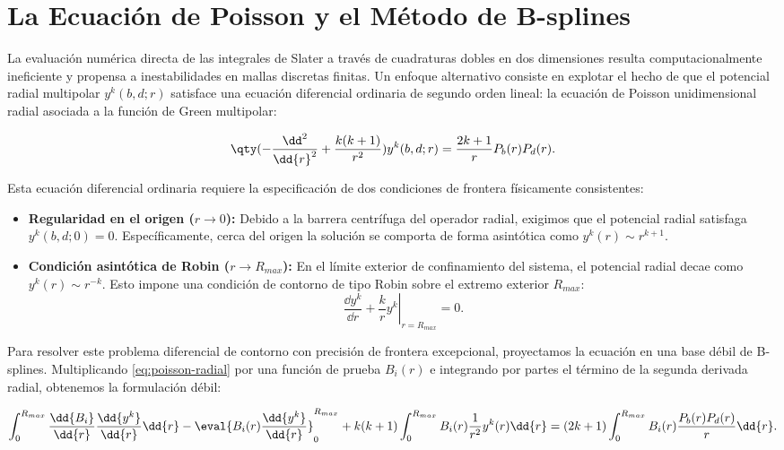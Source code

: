 \section{La Ecuación de Poisson y el Método de B-splines}

La evaluación numérica directa de las integrales de Slater a través de cuadraturas dobles en dos dimensiones resulta computacionalmente ineficiente y propensa a inestabilidades en mallas discretas finitas. Un enfoque alternativo consiste en explotar el hecho de que el potencial radial multipolar \( y^k(b,d;r) \) satisface una ecuación diferencial ordinaria de segundo orden lineal: la ecuación de Poisson unidimensional radial asociada a la función de Green multipolar:

\begin{equation}
  \label{eq:poisson-radial}
  \qty( -\frac{\dd^2}{\dd{r}^2} + \frac{k(k+1)}{r^2} ) y^k(b, d; r) = \frac{2k+1}{r} P_b(r) P_d(r).
\end{equation}

Esta ecuación diferencial ordinaria requiere la especificación de dos condiciones de frontera físicamente consistentes:
\begin{itemize}
\item \textbf{Regularidad en el origen (\(r \to 0\)):} Debido a la barrera centrífuga del operador radial, exigimos que el potencial radial satisfaga \( y^k(b,d;0) = 0 \). Específicamente, cerca del origen la solución se comporta de forma asintótica como \( y^k(r) \sim r^{k+1} \).
\item \textbf{Condición asintótica de Robin (\(r \to R_{max}\)):} En el límite exterior de confinamiento del sistema, el potencial radial decae como \( y^k(r) \sim r^{-k} \). Esto impone una condición de contorno de tipo Robin sobre el extremo exterior \( R_{max} \):
  \begin{equation}
    \label{eq:robin}
    \left. \frac{\dd{y^k}}{\dd{r}} + \frac{k}{r} y^k \right|_{r=R_{max}} = 0.
  \end{equation}
\end{itemize}

Para resolver este problema diferencial de contorno con precisión de frontera excepcional, proyectamos la ecuación en una base débil de B-splines. Multiplicando \eqref{eq:poisson-radial} por una función de prueba \( B_i(r) \) e integrando por partes el término de la segunda derivada radial, obtenemos la formulación débil:

\begin{equation}
  \int_0^{R_{max}} \frac{\dd{B_i}}{\dd{r}} \frac{\dd{y^k}}{\dd{r}} \dd{r} - \eval{ B_i(r) \frac{\dd{y^k}}{\dd{r}} }_0^{R_{max}} + k(k+1) \int_0^{R_{max}} B_i(r) \frac{1}{r^2} y^k(r) \dd{r} = (2k+1) \int_0^{R_{max}} B_i(r) \frac{P_b(r) P_d(r)}{r} \dd{r}.
\end{equation}

